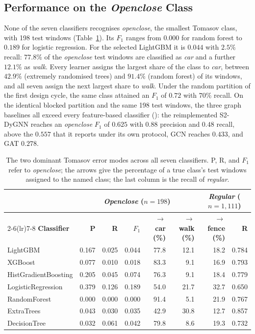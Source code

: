 \subsection{Performance on the \emph{Openclose} Class}
\label{sec:resOpenclose}
None of the seven classifiers recognises \emph{openclose}, the smallest Tomasov class, with 198 test windows (Table~\ref{tab:error_modes}). Its $F_1$ ranges from $0.000$ for random forest to $0.189$ for logistic regression. For the selected LightGBM it is $0.044$ with $2.5\%$ recall: $77.8\%$ of the \emph{openclose} test windows are classified as \emph{car} and a further $12.1\%$ as \emph{walk}. Every learner assigns the largest share of the class to \emph{car}, between $42.9\%$ (extremely randomised trees) and $91.4\%$ (random forest) of its windows, and all seven assign the next largest share to \emph{walk}. Under the random partition of the first design cycle, the same class attained an $F_1$ of $0.72$ with $70\%$ recall. On the identical blocked partition and the same 198 test windows, the three graph baselines all exceed every feature-based classifier (): the reimplemented S2-DyGNN reaches an \emph{openclose} $F_1$ of $0.625$ with $0.88$ precision and $0.48$ recall, above the $0.557$ that it reports under its own protocol, GCN reaches $0.433$, and GAT $0.278$.

\begin{table}[!htbp]
	\centering
	\caption{The two dominant Tomasov error modes across all seven classifiers. P, R, and $F_1$ refer to \emph{openclose}; the arrows give the percentage of a true class's test windows assigned to the named class; the last column is the recall of \emph{regular}.}
	\label{tab:error_modes}
	\footnotesize
	\setlength{\tabcolsep}{4pt}
	\begin{tabular}{@{}lrrrrrrr@{}}
		\toprule
		& \multicolumn{5}{c}{\textbf{\emph{Openclose}} ($n = 198$)} & \multicolumn{2}{c}{\textbf{\emph{Regular}} ($n = 1{,}111$)}\\
		\cmidrule(lr){2-6}\cmidrule(lr){7-8}
		\textbf{Classifier} & \textbf{P} & \textbf{R} & \textbf{$F_1$} & \textbf{$\rightarrow$ car (\%)} & \textbf{$\rightarrow$ walk (\%)} & \textbf{$\rightarrow$ fence (\%)} & \textbf{R}\\
		\midrule
		LightGBM             & 0.167 & 0.025 & 0.044 & 77.8 & 12.1 & 18.2 & 0.784\\
		XGBoost              & 0.077 & 0.010 & 0.018 & 83.3 & 9.1 & 16.9 & 0.793\\
		HistGradientBoosting & 0.205 & 0.045 & 0.074 & 76.3 & 9.1 & 18.4 & 0.779\\
		LogisticRegression   & 0.379 & 0.126 & 0.189 & 54.0 & 21.7 & 32.7 & 0.650\\
		RandomForest         & 0.000 & 0.000 & 0.000 & 91.4 & 5.1 & 21.9 & 0.767\\
		ExtraTrees           & 0.043 & 0.030 & 0.035 & 42.9 & 30.8 & 12.7 & 0.857\\
		DecisionTree         & 0.032 & 0.061 & 0.042 & 79.8 & 8.6 & 19.3 & 0.732\\
		\bottomrule
	\end{tabular}
\end{table}

